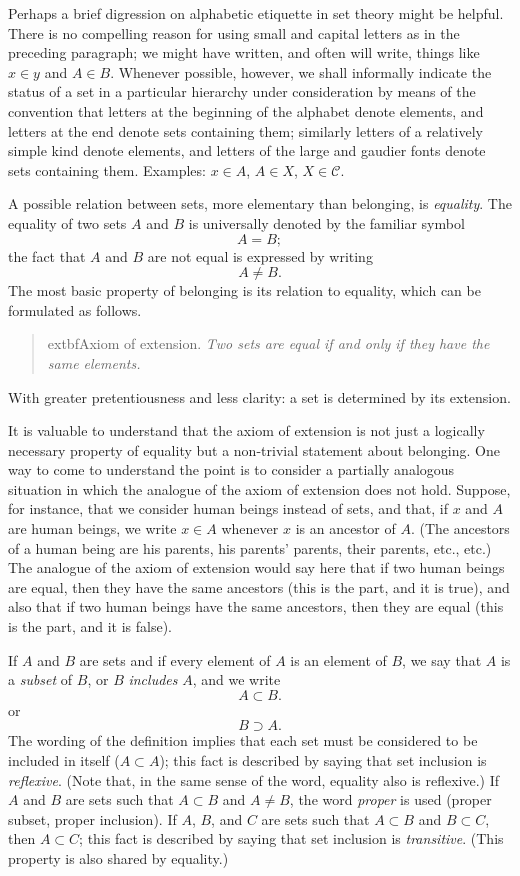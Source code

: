   Perhaps a brief digression on alphabetic etiquette in set theory might be helpful. 
 There is no compelling reason for using small and capital letters as in the preceding paragraph; we might have written, and often will write, things like $x \in y$ and $A \in B$. 
 Whenever possible, however, we shall informally indicate the status of a set in a particular hierarchy under consideration by means of the convention that letters at the beginning of the alphabet denote elements, and letters at the end denote sets containing them; similarly letters of a relatively simple kind denote elements, and letters of the large and gaudier fonts denote sets containing them. 
 Examples: $x \in A$, $A \in X$, $X \in \mathcal{C}$.


  A possible relation between sets, more elementary than belonging, is \textit{equality}. 
 The equality of two sets $A$ and $B$ is universally denoted by the familiar symbol  
\[A = B;\]    the fact that $A$ and $B$ are not equal is expressed by writing  
\[A \neq B.\]    
 The most basic property of belonging is its relation to equality, which can be formulated as follows.


  \begin{quote} 
 	extbf{Axiom of extension.} 
 \textit{Two sets are equal if and only if they have the same elements.} 
 \end{quote}


  With greater pretentiousness and less clarity: a set is determined by its extension.


  It is valuable to understand that the axiom of extension is not just a logically necessary property of equality but a non-trivial statement about belonging. 
 One way to come to understand the point is to consider a partially analogous situation in which the analogue of the axiom of extension does not hold. 
 Suppose, for instance, that we consider human beings instead of sets, and that, if $x$ and $A$ are human beings, we write $x \in A$ whenever $x$ is an ancestor of $A$. 
 (The ancestors of a human being are his parents, his parents' parents, their parents, etc., etc.) 
 The analogue of the axiom of extension would say here that if two human beings are equal, then they have the same ancestors (this is the  part, and it is true), and also that if two human beings have the same ancestors, then they are equal (this is the  part, and it is false).


  If $A$ and $B$ are sets and if every element of $A$ is an element of $B$, we say that $A$ is a \textit{subset} of $B$, or $B$ \textit{includes} $A$, and we write  
\[A \subset B.\]    or  
\[B \supset A.\]    
 The wording of the definition implies that each set must be considered to be included in itself ($A \subset A$); this fact is described by saying that set inclusion is \textit{reflexive}. (Note that, in the same sense of the word, equality also is reflexive.) 
 If $A$ and $B$ are sets such that $A \subset B$ and $A \neq B$, the word \textit{proper} is used (proper subset, proper inclusion). 
 If $A$, $B$, and $C$ are sets such that $A \subset B$ and $B \subset C$, then $A \subset C$; this fact is described by saying that set inclusion is \textit{transitive}. 
 (This property is also shared by equality.)


